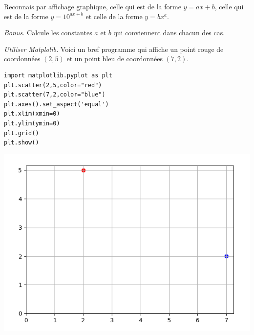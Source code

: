 \documentclass[11pt,class=report,crop=false]{standalone}
\begin{document}
\begin{activite}
\begin{enumerate}
    \medskip
    
    Reconnais par affichage graphique, celle qui est de la forme $y=ax+b$,
    celle qui est de la forme $y = 10^{ax+b}$ et celle de la forme $y = b x^a$.
    
    \emph{Bonus.} Calcule les constantes $a$ et $b$ qui conviennent dans chacun des cas.
   
    
  \end{enumerate}


\emph{Utiliser Matplolib.} Voici un bref programme qui affiche un point rouge de coordonnées $(2,5)$ et un point bleu de coordonnées $(7,2)$. 

\begin{minipage}{0.4\textwidth}
\begin{lstlisting}
import matplotlib.pyplot as plt
plt.scatter(2,5,color="red")
plt.scatter(7,2,color="blue")
plt.axes().set_aspect('equal')
plt.xlim(xmin=0)
plt.ylim(ymin=0)
plt.grid()
plt.show()
\end{lstlisting}
\end{minipage}\quad
\begin{minipage}{0.55\textwidth}
\includegraphics[scale=\myscale,scale=0.4]{ecran_logarithme_1}
\end{minipage}
\end{activite}



\end{document}
